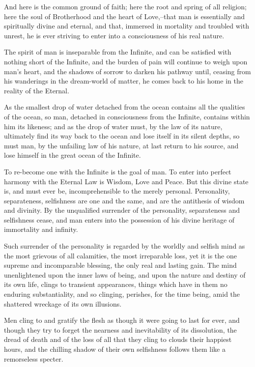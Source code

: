 \documentclass[12pt,oneside]{scrbook}
\begin{document}
  And here is the common ground of faith; here the root and spring of all
  religion; here the soul of Brotherhood and the heart of Love,--that man
  is essentially and spiritually divine and eternal, and that, immersed in
  mortality and troubled with unrest, he is ever striving to enter into a
  consciousness of his real nature.
  
  The spirit of man is inseparable from the Infinite, and can be satisfied
  with nothing short of the Infinite, and the burden of pain will continue
  to weigh upon man's heart, and the shadows of sorrow to darken his
  pathway until, ceasing from his wanderings in the dream-world of matter,
  he comes back to his home in the reality of the Eternal.
  
  As the smallest drop of water detached from the ocean contains all the
  qualities of the ocean, so man, detached in consciousness from the
  Infinite, contains within him its likeness; and as the drop of water
  must, by the law of its nature, ultimately find its way back to the
  ocean and lose itself in its silent depths, so must man, by the
  unfailing law of his nature, at last return to his source, and lose
  himself in the great ocean of the Infinite.
  
  To re-become one with the Infinite is the goal of man. To enter into
  perfect harmony with the Eternal Law is Wisdom, Love and Peace. But this
  divine state is, and must ever be, incomprehensible to the merely
  personal. Personality, separateness, selfishness are one and the same,
  and are the antithesis of wisdom and divinity. By the unqualified
  surrender of the personality, separateness and selfishness cease, and
  man enters into the possession of his divine heritage of immortality and
  infinity.
  
  Such surrender of the personality is regarded by the worldly and selfish
  mind as the most grievous of all calamities, the most irreparable loss,
  yet it is the one supreme and incomparable blessing, the only real and
  lasting gain. The mind unenlightened upon the inner laws of being, and
  upon the nature and destiny of its own life, clings to transient
  appearances, things which have in them no enduring substantiality, and
  so clinging, perishes, for the time being, amid the shattered wreckage
  of its own illusions.
  
  Men cling to and gratify the flesh as though it were going to last for
  ever, and though they try to forget the nearness and inevitability of
  its dissolution, the dread of death and of the loss of all that they
  cling to clouds their happiest hours, and the chilling shadow of their
  own selfishness follows them like a remorseless specter.
  
\end{document}
